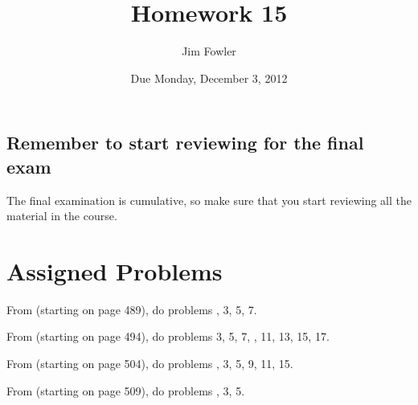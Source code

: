 \documentclass[12pt]{handout}
\title{Homework 15}
\date{Due Monday, December  3, 2012}
\author{Jim Fowler}
\begin{document}
\maketitle







\subsection*{Remember to start reviewing for the final exam}
The final examination is cumulative, so make sure that you start reviewing all the material in the course.




\section*{Assigned Problems}

From  (starting on page 489),
do problems , 3, 5, 7.
\vspace{1ex}

From  (starting on page 494),
do problems 3, 5, 7, , 11, 13, 15, 17.
\vspace{1ex}

From  (starting on page 504),
do problems , 3, 5, 9, 11, 15.
\vspace{1ex}

From  (starting on page 509),
do problems , 3, 5.
\vspace{1ex}
\end{document}
